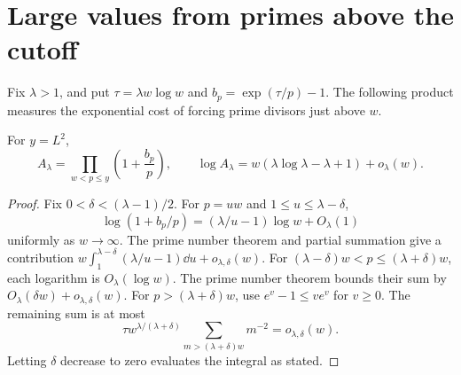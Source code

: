 \section{Large values from primes above the cutoff}

Fix \(\lambda>1\), and put \(\tau=\lambda w\log w\) and
\(b_p=\exp(\tau/p)-1\). The following product measures the exponential
cost of forcing prime divisors just above \(w\).
\begin{lemma}\label{lem:product}
For \(y=L^2\),
\[
 A_\lambda=\prod_{w<p\le y}\left(1+\frac{b_p}{p}\right),\qquad
 \log A_\lambda=w(\lambda\log\lambda-\lambda+1)+o_\lambda(w).
\]
\end{lemma}
\begin{proof}
Fix \(0<\delta<(\lambda-1)/2\). For \(p=uw\) and
\(1\le u\le\lambda-\delta\),
\[
 \log(1+b_p/p)=(\lambda/u-1)\log w+O_\lambda(1)
\]
uniformly as \(w\to\infty\). The prime number theorem and partial summation
give a contribution
\(w\int_1^{\lambda-\delta}(\lambda/u-1)\dd u+o_{\lambda,\delta}(w)\).
For \((\lambda-\delta)w<p\le(\lambda+\delta)w\), each logarithm is
\(O_\lambda(\log w)\). The prime number theorem bounds their sum by
\(O_\lambda(\delta w)+o_{\lambda,\delta}(w)\). For \(p>(\lambda+\delta)w\),
use \(e^v-1\le ve^v\) for \(v\ge0\). The remaining sum is at most
\[
 \tau w^{\lambda/(\lambda+\delta)}
          \sum_{m>(\lambda+\delta)w}m^{-2}=o_{\lambda,\delta}(w).
\]
Letting \(\delta\) decrease to zero evaluates the integral as stated.
\end{proof}

